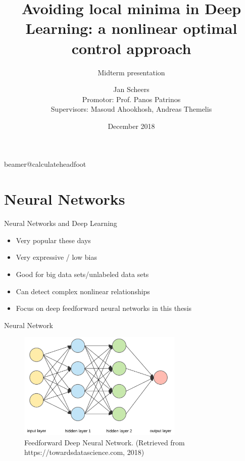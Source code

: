 \documentclass[11pt,t]{beamer}
\title[Midterm presentation]{Avoiding local minima in Deep Learning: a nonlinear optimal control approach} %
\subtitle{Midterm presentation}
\author{Jan Scheers \\
Promotor: Prof. Panos Patrinos \\
Supervisors: Masoud Ahookhosh, Andreas Themelis}
\date{December 2018}
\begin{document}
\csname beamer@calculateheadfoot\endcsname %


\begin{frame}
	\titlepage
\end{frame}

\section{Neural Networks}

\begin{frame}{Neural Networks and Deep Learning}
   \begin{itemize}
      \itemsep 15pt
      \item Very popular these days
      \item Very expressive / low bias
      \item Good for big data sets/unlabeled data sets
      \item Can detect complex nonlinear relationships
      \item Focus on deep feedforward neural networks in this thesis
   \end{itemize}
\end{frame}

\begin{frame}{Neural Network}
   \begin{figure}
	\centering
	\includegraphics[width=0.7\textwidth]{network}
	\caption{Feedforward Deep Neural Network. (Retrieved from https://towardsdatascience.com, 2018)}
	\end{figure}
\end{frame}
\end{document}
